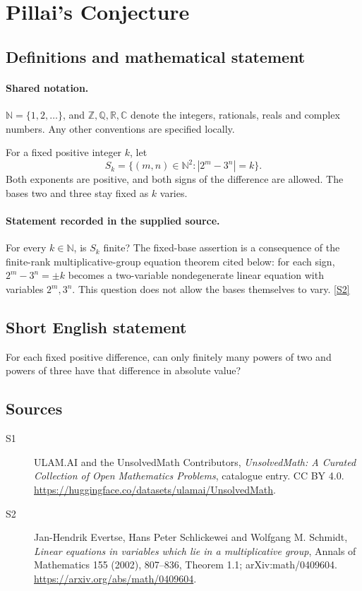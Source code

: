 \documentclass[11pt]{article}
\newcommand{\sref}[2]{\hyperlink{source:#1:#2}{[S#2]}}
\begin{document}
\section{Pillai's Conjecture}\label{statement}

\subsection{Definitions and mathematical statement}

\paragraph{Shared notation.}$\mathbb N=\{1,2,\ldots\}$, and $\mathbb Z,\mathbb Q,\mathbb R,\mathbb C$ denote the integers, rationals, reals and complex numbers. Any other conventions are specified locally.


For a fixed positive integer \(k\), let
\[
 S_k=\{(m,n)\in\mathbb N^2:|2^m-3^n|=k\}.
\]
Both exponents are positive, and both signs of the difference are allowed.
The bases two and three stay fixed as \(k\) varies.
\paragraph{Statement recorded in the supplied source.}
For every \(k\in\mathbb N\), is \(S_k\) finite?
The fixed-base assertion is a consequence of the finite-rank
multiplicative-group equation theorem cited below: for each sign,
\(2^m-3^n=\pm k\) becomes a two-variable nondegenerate linear equation
with variables \(2^m,3^n\).  This question does not allow the bases
themselves to vary. \sref{statement}{2}
\subsection{Short English statement}
For each fixed positive difference, can only finitely many powers of two and powers of three have that difference in absolute value?
\subsection{Sources}
\begin{description}
\item[\hypertarget{source:statement:1}{S1}] ULAM.AI and the UnsolvedMath Contributors, \emph{UnsolvedMath: A Curated Collection of Open Mathematics Problems}, catalogue entry. CC BY 4.0. \url{https://huggingface.co/datasets/ulamai/UnsolvedMath}.
\item[\hypertarget{source:statement:2}{S2}] Jan-Hendrik Evertse, Hans Peter Schlickewei and Wolfgang M. Schmidt, \emph{Linear equations in variables which lie in a multiplicative group}, Annals of Mathematics 155 (2002), 807--836, Theorem 1.1; arXiv:math/0409604. \url{https://arxiv.org/abs/math/0409604}.
\end{description}
\label{end:statement}
\end{document}
